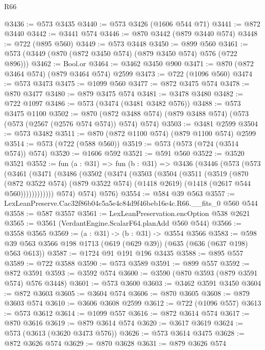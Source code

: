\begin{lexlean}{R66}
\begin{coremodule}
@3436 := @573 @3435
@3440 := @573 @3426 (@1606 @544 @71)
@3441 := @872 @3440
@3442 := @3441 @574
@3446 := @870 @3442 (@879 @3440 @574)
@3448 := @722 (@895 @560)
@3449 := @573 @3448
@3450 := @899 @560
@3461 := @573 (@3449 (@870 (@872 @3450 @574) (@879 @3450 @574) @576 (@722 @896)))
@3462 := Bool.or
@3464 := @3462 @3450 @900
@3471 := @870 (@872 @3464 @574) (@879 @3464 @574) @2599
@3473 := @722 (@1096 @560)
@3474 := @573 @3473
@3475 := @1099 @560
@3477 := @872 @3475 @574
@3478 := @870 @3477
@3480 := @879 @3475 @574
@3481 := @3478 @3480
@3482 := @722 @1097
@3486 := @573 (@3474 (@3481 @3482 @576))
@3488 := @573 @3475 @1100
@3502 := @870 (@872 @3488 @574) (@879 @3488 @574) (@573 (@573 (@2567 (@2576 @574 @574)) @574) @574)
@3503 := @3481 @2599
@3504 := @573 @3482
@3511 := @870 (@872 @1100 @574) (@879 @1100 @574) @2599
@3514 := @573 (@722 (@588 @560))
@3519 := @573 (@573 (@724 (@3514 @574)) @574)
@3520 := @1606 @592
@3521 := @591 @560
@3522 := @3520 @3521
@3552 := fun (a : @31) =>
  fun (b : @31) =>
  @3436
    (@3446
      (@573
        (@573
          (@3461
            (@3471
              (@3486
                (@3502
                  (@3474
                    (@3503
                      (@3504
                        (@3511
                          (@3519
                            (@870
                              (@872 @3522 @574)
                              (@879 @3522 @574)
                              (@1418 @2619)
                              (@1418 (@2617 @544 @560))))))))))))
          @574)
        @574)
      @576)
@3554 := @584 @39 @563
@3557 := LexLeanPreserve.Cac32f86b04c5a5e4c84d9f46beb16e4c.R66.__fits_0 @560 @544
@3558 := @587 @3557
@3561 := LexLeanPreservation.encOption @538 @2621
@3565 := @3561 (VerdantEngine.ScalarF64.planAdd @560 @544)
@3566 := @3558 @3565
@3569 := (a : @31) -> (b : @31) -> @3554 @3566
@3583 := @598 @39 @563 @3566 @198 @1713 (@619 (@629 @39)) (@635 (@636 (@637 @198) @563 @613))
@3587 := @1724 @91 @191 @196 @3435
@3588 := @895 @557
@3589 := @722 @3588
@3590 := @573 @3589
@3591 := @899 @557
@3592 := @872 @3591
@3593 := @3592 @574
@3600 := @3590 (@870 @3593 (@879 @3591 @574) @576 @3448)
@3601 := @573 @3600
@3603 := @3462 @3591 @3450
@3604 := @872 @3603
@3605 := @3604 @574
@3606 := @870 @3605
@3608 := @879 @3603 @574
@3610 := @3606 @3608 @2599
@3612 := @722 (@1096 @557)
@3613 := @573 @3612
@3614 := @1099 @557
@3616 := @872 @3614 @574
@3617 := @870 @3616
@3619 := @879 @3614 @574
@3620 := @3617 @3619
@3624 := @573 (@3613 (@3620 @3473 @576))
@3626 := @573 @3614 @3475
@3628 := @872 @3626 @574
@3629 := @870 @3628
@3631 := @879 @3626 @574

\end{coremodule}
\end{lexlean}
